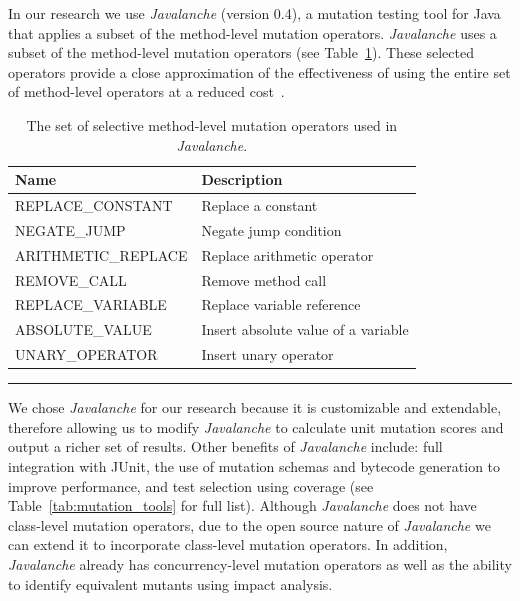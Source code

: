 In our research we use \emph{Javalanche} (version 0.4), a mutation testing tool for Java~\cite{SZ09} that applies a subset of the method-level mutation operators. \emph{Javalanche} uses a subset of the method-level mutation operators (see Table~\ref{tab:javalanche_operators}). These selected operators provide a close approximation of the effectiveness of using the entire set of method-level operators at a reduced cost~\cite{OLR+96}.

\begin{table}[!tb]
  \centering
  \begin{tabular}{|l|l|}
    \hline
    \rowcolor[RGB]{169,196,223}
    \textbf{Name} & \textbf{Description} \\
    \hline REPLACE\_CONSTANT & Replace a constant \\
    \hline NEGATE\_JUMP & Negate jump condition \\
    \hline ARITHMETIC\_REPLACE & Replace arithmetic operator \\
    \hline REMOVE\_CALL & Remove method call \\
    \hline REPLACE\_VARIABLE & Replace variable reference\\
    \hline ABSOLUTE\_VALUE & Insert absolute value of a variable \\
    \hline UNARY\_OPERATOR & Insert unary operator \\
    \hline
  \end{tabular}
  \caption{The set of selective method-level mutation operators used in \emph{Javalanche}.}
  \label{tab:javalanche_operators}
  \vspace{2mm}
  \hrule
\end{table}

We chose \emph{Javalanche} for our research because it is customizable and extendable, therefore allowing us to modify \emph{Javalanche} to calculate unit mutation scores and output a richer set of results. Other benefits of \emph{Javalanche} include: full integration with JUnit, the use of mutation schemas and bytecode generation to improve performance, and test selection using coverage (see Table~\ref{tab:mutation_tools} for full list). Although \emph{Javalanche} does not have class-level mutation operators, due to the open source nature of \emph{Javalanche} we can extend it to incorporate class-level mutation operators. In addition, \emph{Javalanche} already has concurrency-level mutation operators as well as the ability to identify equivalent mutants using impact analysis.

